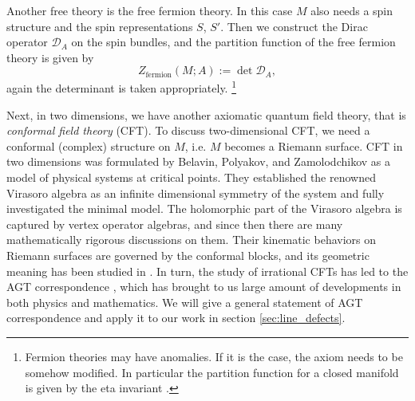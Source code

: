 Another free theory is the free fermion theory. In this case $M$
also needs a spin structure and the spin representations $S$, $S'$.
Then we construct the Dirac operator $\mathcal{D}_{A}$ on the spin
bundles, and the partition function of the free fermion theory is given
by
\begin{equation}
Z_{\mathrm{fermion}}(M;A):=\det\mathcal{D}_{A},
\end{equation}
again the determinant is taken appropriately.%
%
\footnote{Fermion theories may have anomalies. If it is the case, the axiom
needs to be somehow modified. In particular the partition function
for a closed manifold is given by the eta invariant \cite{Dai:1994kq}.}

Next, in two dimensions, we have another axiomatic quantum field theory,
that is \emph{conformal field theory} (CFT).
To discuss two-dimensional CFT, we need a conformal (complex) structure
on $M$, i.e. $M$ becomes a Riemann surface. CFT in two dimensions was formulated by Belavin, Polyakov,
and Zamolodchikov \cite{Belavin:1984vu} as a model of physical systems at critical
points. They established the renowned Virasoro algebra as an infinite
dimensional symmetry of the system and fully investigated the minimal
model. The holomorphic part of the Virasoro algebra is captured by
vertex operator algebras, and since then there are many mathematically
rigorous discussions on them. Their kinematic behaviors on Riemann
surfaces are governed by the conformal blocks, and its geometric meaning
has been studied in \cite{Friedan:1986ua}. In turn, the study of irrational
CFTs has led to the AGT correspondence \cite{Alday:2009aq}, which has brought
to us large amount of developments in both physics and mathematics.
We will give a general statement of AGT correspondence and apply it to our work
in section \ref{sec:line_defects}.


